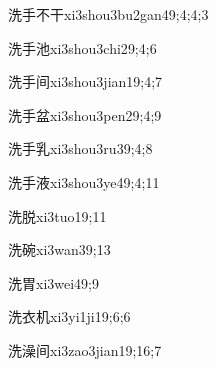 \begin{verbete}{洗手不干}{xi3shou3bu2gan4}{9;4;4;3}
\end{verbete}

\begin{verbete}{洗手池}{xi3shou3chi2}{9;4;6}
\end{verbete}

\begin{verbete}{洗手间}{xi3shou3jian1}{9;4;7}
\end{verbete}

\begin{verbete}{洗手盆}{xi3shou3pen2}{9;4;9}
\end{verbete}

\begin{verbete}{洗手乳}{xi3shou3ru3}{9;4;8}
\end{verbete}

\begin{verbete}{洗手液}{xi3shou3ye4}{9;4;11}
\end{verbete}

\begin{verbete}{洗脱}{xi3tuo1}{9;11}
\end{verbete}

\begin{verbete}{洗碗}{xi3wan3}{9;13}
\end{verbete}

\begin{verbete}{洗胃}{xi3wei4}{9;9}
\end{verbete}

\begin{verbete}{洗衣机}{xi3yi1ji1}{9;6;6}
\end{verbete}

\begin{verbete}{洗澡间}{xi3zao3jian1}{9;16;7}
\end{verbete}

